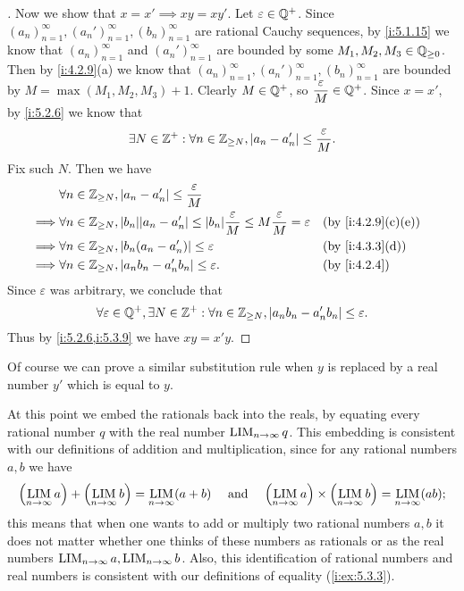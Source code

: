 \begin{proof}[]
  Now we show that \(x = x' \implies xy = xy'\).
  Let \(\varepsilon \in \mathbb{Q}^+\).
  Since \((a_n)_{n = 1}^\infty, (a_n')_{n = 1}^\infty, (b_n)_{n = 1}^\infty\) are rational Cauchy sequences, by \cref{i:5.1.15} we know that \((a_n)_{n = 1}^\infty\) and \((a_n')_{n = 1}^\infty\) are bounded by some \(M_1, M_2, M_3 \in \mathbb{Q}_{\geq 0}\).
  Then by \cref{i:4.2.9}(a) we know that \((a_n)_{n = 1}^\infty, (a_n')_{n = 1}^\infty, (b_n)_{n = 1}^\infty\) are bounded by \(M = \max(M_1, M_2, M_3) + 1\).
  Clearly \(M \in \mathbb{Q}^+\), so \(\dfrac{\varepsilon}{M} \in \mathbb{Q}^+\).
  Since \(x = x'\), by \cref{i:5.2.6} we know that
  \[
    \exists N \in \mathbb{Z}^+ : \forall n \in \mathbb{Z}_{\geq N}, \left\lvert a_n - a_n'\right\rvert \leq \dfrac{\varepsilon}{M}.
  \]
  Fix such \(N\).
  Then we have
  \begin{align*}
             & \forall n \in \Z_{\geq N}, \abs{a_n - a_n'} \leq \dfrac{\varepsilon}{M}                                                                                        \\
    \implies & \forall n \in \Z_{\geq N}, \abs{b_n} \abs{a_n - a_n'} \leq \abs{b_n} \dfrac{\varepsilon}{M} \leq M \dfrac{\varepsilon}{M} = \varepsilon &  & \by{i:4.2.9}[c,e] \\
    \implies & \forall n \in \Z_{\geq N}, \abs{b_n (a_n - a_n')} \leq \varepsilon                                                                      &  & \by{i:4.3.3}[d]   \\
    \implies & \forall n \in \Z_{\geq N}, \abs{a_n b_n - a_n' b_n} \leq \varepsilon.                                                                   &  & \by{i:4.2.4}
  \end{align*}
  Since \(\varepsilon\) was arbitrary, we conclude that
  \[
    \forall \varepsilon \in \mathbb{Q}^+, \exists N \in \mathbb{Z}^+ : \forall n \in \mathbb{Z}_{\geq N}, \left\lvert a_n b_n - a_n' b_n\right\rvert \leq \varepsilon.
  \]
  Thus by \cref{i:5.2.6,i:5.3.9} we have \(xy = x'y\).
\end{proof}

\begin{note}
  Of course we can prove a similar substitution rule when \(y\) is replaced by a real number \(y'\) which is equal to \(y\).
\end{note}

\begin{ac}\label{i:ac:5.3.1}
  At this point we embed the rationals back into the reals, by equating every rational number \(q\) with the real number \(\operatorname*{LIM}_{n \to \infty} q\).
  This embedding is consistent with our definitions of addition and multiplication, since for any rational numbers \(a, b\) we have
  \[
    \pa{\LIM_{n \to \infty} a} + \pa{\LIM_{n \to \infty} b} = \LIM_{n \to \infty} (a + b) \quad \text{ and } \quad \pa{\LIM_{n \to \infty} a} \times \pa{\LIM_{n \to \infty} b} = \LIM_{n \to \infty} (ab);
  \]
  this means that when one wants to add or multiply two rational numbers \(a, b\) it does not matter whether one thinks of these numbers as rationals or as the real numbers \(\operatorname*{LIM}_{n \to \infty} a, \operatorname*{LIM}_{n \to \infty} b\).
  Also, this identification of rational numbers and real numbers is consistent with our definitions of equality (\cref{i:ex:5.3.3}).
\end{ac}

